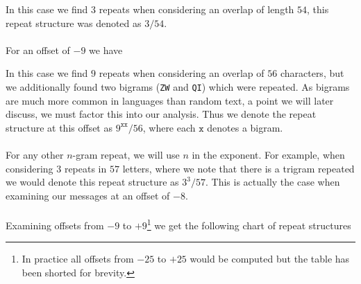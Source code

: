 In this case we find $3$ repeats when considering an overlap of
length $54$, this repeat structure was denoted as $3/54$.
\\\\For an offset of $-9$ we have
\begin{center}
\end{center}
In this case we find $9$ repeats when considering an overlap of
$56$ characters, but we additionally found two bigrams (\texttt{ZW}
and \texttt{QI}) which were repeated. As bigrams are much more
common in languages than random text, a point we will later
discuss, we must factor this into our analysis. Thus we denote the
repeat structure at this offset as $9^{\texttt{xx}}/56$, where each
$\texttt{x}$ denotes a bigram.\\\\For any other $n$-gram repeat, we
will use $n$ in the exponent. For example, when considering $3$
repeats in $57$ letters, where we note that there is a trigram
repeated we would denote this repeat structure as $3^{3}/57$. This
is actually the case when examining our messages at an offset of $-8$.
\\\\Examining offsets from $-9$ to $+9$\footnote{In practice all
  offsets from $-25$ to $+25$ would be computed but the table has
been shorted for brevity.} we get the following chart of repeat structures
